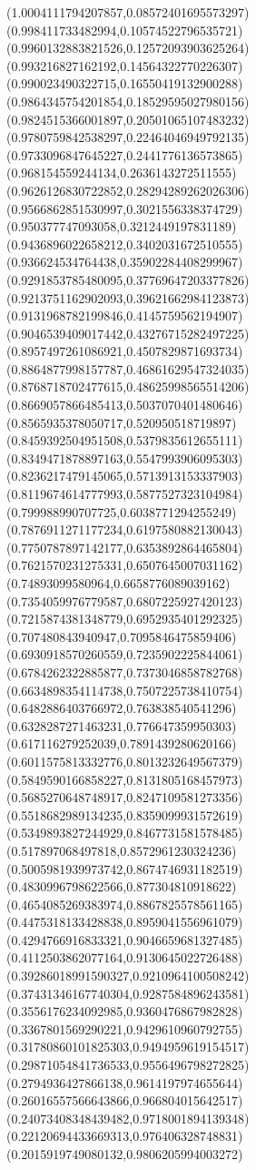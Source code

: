 {(1.0004111794207857,0.08572401695573297)
(0.998411733482994,0.10574522796535721)
(0.9960132883821526,0.12572093903625264)
(0.993216827162192,0.14564322770226307)
(0.990023490322715,0.16550419132900288)
(0.9864345754201854,0.18529595027980156)
(0.9824515366001897,0.20501065107483232)
(0.9780759842538297,0.22464046949792135)
(0.9733096847645227,0.2441776136573865)
(0.968154559244134,0.2636143272511555)
(0.9626126830722852,0.28294289262026306)
(0.9566862851530997,0.3021556338374729)
(0.950377747093058,0.3212449197831189)
(0.9436896022658212,0.3402031672510555)
(0.936624534764438,0.35902284408299967)
(0.9291853785480095,0.37769647203377826)
(0.9213751162902093,0.39621662984123873)
(0.9131968782199846,0.4145759562194907)
(0.9046539409017442,0.43276715282497225)
(0.8957497261086921,0.4507829871693734)
(0.8864877998157787,0.46861629547324035)
(0.8768718702477615,0.48625998565514206)
(0.8669057866485413,0.5037070401480646)
(0.8565935378050717,0.520950518719897)
(0.8459392504951508,0.5379835612655111)
(0.8349471878897163,0.5547993906095303)
(0.8236217479145065,0.5713913153337903)
(0.8119674614777993,0.5877527323104984)
(0.799988990707725,0.6038771294255249)
(0.7876911271177234,0.6197580882130043)
(0.7750787897142177,0.6353892864465804)
(0.7621570231275331,0.6507645007031162)
(0.74893099580964,0.6658776089039162)
(0.7354059976779587,0.6807225927420123)
(0.7215874381348779,0.6952935401292325)
(0.707480843940947,0.7095846475859406)
(0.6930918570260559,0.7235902225844061)
(0.6784262322885877,0.7373046858782768)
(0.6634898354114738,0.7507225738410754)
(0.6482886403766972,0.763838540541296)
(0.6328287271463231,0.776647359950303)
(0.617116279252039,0.7891439280620166)
(0.6011575813332776,0.8013232649567379)
(0.5849590166858227,0.8131805168457973)
(0.5685270648748917,0.8247109581273356)
(0.5518682989134235,0.8359099931572619)
(0.5349893827244929,0.8467731581578485)
(0.517897068497818,0.8572961230324236)
(0.5005981939973742,0.8674746931182519)
(0.4830996798622566,0.877304810918622)
(0.4654085269383974,0.8867825578561165)
(0.4475318133428838,0.8959041556961079)
(0.4294766916833321,0.9046659681327485)
(0.4112503862077164,0.9130645022726488)
(0.39286018991590327,0.9210964100508242)
(0.37431346167740304,0.9287584896243581)
(0.3556176234092985,0.9360476867982828)
(0.3367801569290221,0.9429610960792755)
(0.31780860101825303,0.9494959619154517)
(0.29871054841736533,0.9556496798272825)
(0.2794936427866138,0.9614197974655644)
(0.26016557566643866,0.966804015642517)
(0.24073408348439482,0.9718001894139348)
(0.22120694433669313,0.976406328748831)
(0.2015919749080132,0.9806205994003272)
}
